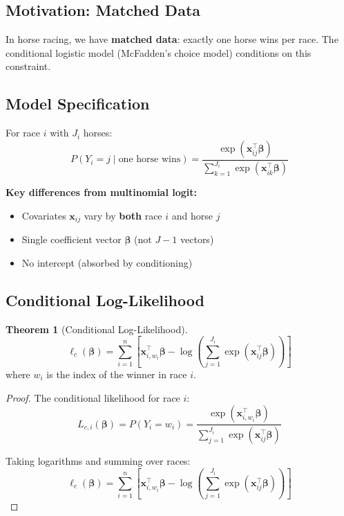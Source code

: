 \documentclass[11pt,letterpaper]{article}
\theoremstyle{definition}
\newtheorem{theorem}{Theorem}[section]
\newcommand{\bb}{\boldsymbol{\beta}}
\begin{document}
\subsection{Motivation: Matched Data}

In horse racing, we have \textbf{matched data}: exactly one horse wins per race. The conditional logistic model (McFadden's choice model) conditions on this constraint.

\subsection{Model Specification}

For race $i$ with $J_i$ horses:
\begin{equation}
    P(Y_i = j \mid \text{one horse wins}) = \frac{\exp(\mathbf{x}_{ij}^\top \bb)}{\sum_{k=1}^{J_i} \exp(\mathbf{x}_{ik}^\top \bb)}
    \label{eq:conditional-logit}
\end{equation}

\textbf{Key differences from multinomial logit:}
\begin{itemize}
    \item Covariates $\mathbf{x}_{ij}$ vary by \textbf{both} race $i$ and horse $j$
    \item Single coefficient vector $\bb$ (not $J-1$ vectors)
    \item No intercept (absorbed by conditioning)
\end{itemize}

\subsection{Conditional Log-Likelihood}

\begin{theorem}[Conditional Log-Likelihood]
\begin{equation}
    \ell_c(\bb) = \sum_{i=1}^{n} \left[ \mathbf{x}_{i,w_i}^\top \bb - \log\left(\sum_{j=1}^{J_i} \exp(\mathbf{x}_{ij}^\top \bb)\right) \right]
    \label{eq:cond-loglik}
\end{equation}
where $w_i$ is the index of the winner in race $i$.
\end{theorem}

\begin{proof}
The conditional likelihood for race $i$:
\begin{equation}
    L_{c,i}(\bb) = P(Y_i = w_i) = \frac{\exp(\mathbf{x}_{i,w_i}^\top \bb)}{\sum_{j=1}^{J_i} \exp(\mathbf{x}_{ij}^\top \bb)}
\end{equation}

Taking logarithms and summing over races:
\begin{equation}
    \ell_c(\bb) = \sum_{i=1}^{n} \left[ \mathbf{x}_{i,w_i}^\top \bb - \log\left(\sum_{j=1}^{J_i} \exp(\mathbf{x}_{ij}^\top \bb)\right) \right]
\end{equation}
\end{proof}
\end{document}
